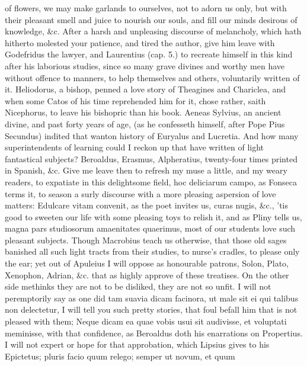 {of flowers, we may make garlands to ourselves, not to adorn us only,
but with their pleasant smell and juice to nourish our souls, and fill
our minds desirous of knowledge, \&c. After a harsh and unpleasing
discourse of melancholy, which hath hitherto molested your patience,
and tired the author, give him leave with Godefridus the lawyer,
and Laurentius (cap. 5.) to recreate himself in this kind after his
laborious studies, since so many grave divines and worthy men have
without offence to manners, to help themselves and others, voluntarily
written of it. Heliodorus, a bishop, penned a love story of Theagines
and Chariclea, and when some Catos of his time reprehended him for it,
chose rather, saith Nicephorus, to leave his bishopric than his
book. Aeneas Sylvius, an ancient divine, and past forty years of age,
(as he confesseth himself, after Pope Pius Secundus) indited that
wanton history of Euryalus and Lucretia. And how many superintendents
of learning could I reckon up that have written of light fantastical
subjects? Beroaldus, Erasmus, Alpheratius, twenty-four times printed in
Spanish, \&c. Give me leave then to refresh my muse a little, and my
weary readers, to expatiate in this delightsome field, hoc deliciarum
campo, as Fonseca terms it, to  season a surly discourse with a
more pleasing aspersion of love matters: Edulcare vitam convenit, as
the poet invites us, curas nugis, \&c., 'tis good to sweeten our life
with some pleasing toys to relish it, and as Pliny tells us, magna pars
studiosorum amaenitates quaerimus, most of our students love such
pleasant subjects. Though Macrobius teach us otherwise,
that those old sages banished all such light tracts from their
studies, to nurse's cradles, to please only the ear; yet out of
Apuleius I will oppose as honourable patrons, Solon, Plato, 
Xenophon, Adrian, \&c. that as highly approve of these treatises. On the
other side methinks they are not to be disliked, they are not so unfit.
I will not peremptorily say as one did tam suavia dicam facinora,
ut male sit ei qui talibus non delectetur, I will tell you such pretty
stories, that foul befall him that is not pleased with them; Neque
dicam ea quae vobis usui sit audivisse, et voluptati meminisse, with
that confidence, as Beroaldus doth his enarrations on Propertius. I
will not expert or hope for that approbation, which Lipsius gives to
his Epictetus; pluris facio quum relego; semper ut novum, et quum
}

